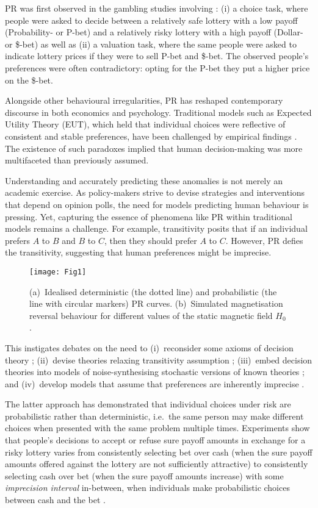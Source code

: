 \documentclass[aps,prl,reprint,superscriptaddress]{revtex4-2}
\begin{document}
PR was first observed in the gambling studies involving \cite{Lic71}: (i) a choice task, where people were asked to decide between a relatively safe lottery with a low payoff (Probability- or P-bet) and a relatively risky lottery with a high payoff (Dollar- or \$-bet) as well as (ii) a valuation task, where the same people were asked to indicate lottery prices if they were to sell P-bet and \$-bet. The observed people’s preferences were often contradictory: opting for the P-bet they put a higher price on the \$-bet.

Alongside other behavioural irregularities, PR has reshaped contemporary discourse in both economics and psychology. Traditional models such as Expected Utility Theory (EUT), which held that individual choices were reflective of consistent and stable preferences, have been challenged by empirical findings \cite{Gre79}. The existence of such paradoxes implied that human decision-making was more multifaceted than previously assumed.

Understanding and accurately predicting these anomalies is not merely an academic exercise. As policy-makers strive to devise strategies and interventions that depend on opinion polls, the need for models predicting human behaviour is pressing. Yet, capturing the essence of phenomena like PR within traditional models remains a challenge. For example, transitivity posits that if an individual prefers $A$ to $B$ and $B$ to $C$, then they should prefer $A$ to $C$. However, PR defies the transitivity, suggesting that human preferences might be imprecise.
\begin{figure}
 \texttt{[image: Fig1]}
 \caption{(a)~Idealised deterministic (the dotted line) and probabilistic (the line with circular markers) PR curves. (b)~Simulated magnetisation reversal behaviour for different values of the static magnetic field $H_0$.\label{Fig1}}
\end{figure}

This instigates debates on the need to (i)~reconsider some axioms of decision theory \cite{butler2018predictably}; (ii)~devise theories relaxing transitivity assumption \cite{loomes1982regret}; (iii)~embed decision theories into models of noise-synthesising stochastic versions of known theories \cite{blavatskyy2010models}; and (iv)~develop models that assume that preferences are inherently imprecise \cite{loomes2017preference}.

The latter approach has demonstrated that individual choices under risk are probabilistic rather than deterministic, i.e.~the same person may make different choices when presented with the same problem multiple times. Experiments show that people's decisions to accept or refuse sure payoff amounts in exchange for a risky lottery varies from consistently selecting bet over cash (when the sure payoff amounts offered against the lottery are not sufficiently attractive) to consistently selecting cash over bet (when the sure payoff amounts increase) with some \textit{imprecision interval} in-between, when individuals make probabilistic choices between cash and the bet \cite{mosteller1951experimental, loomes2014testing, loomes2017preference}. 
\end{document}
